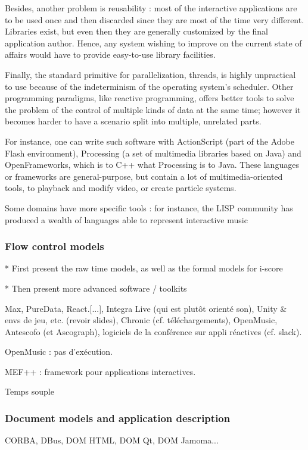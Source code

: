\documentclass{sigchi}
\begin{document}
Besides, another problem is reusability : most of the interactive applications are to be used once and then discarded since they are most of the time very different. Libraries exist, but even then they are generally customized by the final application author. Hence, any system wishing to improve on the current state of affairs would have to provide easy-to-use library facilities.

Finally, the standard primitive for parallelization, threads, is highly unpractical to use because of the indeterminism of the operating system's scheduler. Other programming paradigms, like reactive programming, offers better tools to solve the problem of the control of multiple kinds of data at the same time; however it becomes harder to have a scenario split into multiple, unrelated parts. %

For instance, one can write such software with ActionScript (part of the Adobe Flash environment), Processing (a set of multimedia libraries based on Java) and OpenFrameworks, which is to C++ what Processing is to Java\cite{noble2009programming}. These languages or frameworks are general-purpose, but contain a lot of multimedia-oriented tools, to playback and modify video, or create particle systems. 

Some domains have more specific tools : for instance, the LISP community has produced a wealth of languages able to represent interactive music  %


\subsubsection{Flow control models}

* First present the raw time models, as well as the formal models for i-score

* Then present more advanced software / toolkits


Max, PureData, React.[...], Integra Live (qui est plutôt orienté son), Unity \& envs de jeu, etc. (revoir slides), Chronic (cf. téléchargements), OpenMusic, Antescofo (et Ascograph), logiciels de la conférence sur appli réactives (cf. slack).

OpenMusic : pas d'exécution.

MEF++\cite{ackermann_direct_1994} : framework pour applications interactives.

Temps souple\cite{song_interactive_1999}


\subsubsection{Document models and application description} %
CORBA, DBus, DOM HTML, DOM Qt, DOM Jamoma...
\end{document}
